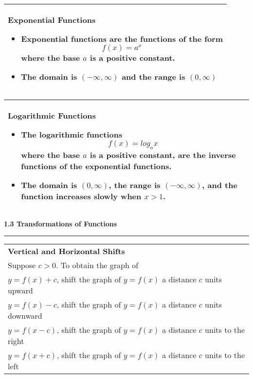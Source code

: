 \documentclass[fleqn]{article}
\begin{document}
\begin{center}
\def\arraystretch{1.3}
{\setlength{\tabcolsep}{16pt}
\begin{tabularx}{.9\textwidth}{|X|}
\hline
	\vspace{1pt}
	\textbf{Exponential Functions}
	\begin{itemize}
	\item \textbf{Exponential functions} are the functions of the form 
	$$f(x) = a^x$$
	where the base $a$ is a positive constant.
	\item The domain is $(-\infty, \infty)$ and the range is $(0,\infty)$
	\end{itemize} \\
\hline
\end{tabularx}}
\vspace{12pt}

\def\arraystretch{1.3}
{\setlength{\tabcolsep}{16pt}
\begin{tabularx}{.9\textwidth}{|X|}
\hline
	\vspace{1pt}
	\textbf{Logarithmic Functions}
	\begin{itemize}
	\item The \textbf{logarithmic functions}
	$$f(x) = log_a x$$
	where the base $a$ is a positive constant, are the inverse functions of the exponential functions. 
	\item The domain is $(0, \infty)$, the range is $(-\infty, \infty)$, and the function increases slowly when $x > 1$.
	\end{itemize} \\
\hline
\end{tabularx}}
\vspace{64pt}

\Large\textbf{1.3 Transformations of Functions}

\noindent\hfill\rule{0.3\textwidth}{.4pt}\hfill
\vspace{12pt}

\large

\def\arraystretch{1.3}
{\setlength{\tabcolsep}{16pt}
\begin{tabularx}{.9\textwidth}{|X|}
\hline
	\vspace{1pt}
	\textbf{Vertical and Horizontal Shifts} \\[6pt]
	\hspace{12pt} Suppose $c>0$. To obtain the graph of \\[6pt]
	\hspace{12pt} $y = f(x) + c$, shift the graph of $y = f(x)$ a distance $c$ units upward \\[3pt]
	\hspace{12pt} $y = f(x) - c$, shift the graph of $y = f(x)$ a distance $c$ units downward \\[3pt]
	\hspace{12pt} $y = f(x-c)$, shift the graph of $y = f(x)$ a distance $c$ units to the right \\[3pt]
	\hspace{12pt} $y = f(x+c)$, shift the graph of $y = f(x)$ a distance $c$ units to the left \\[12pt]	
\hline
\end{tabularx}}
\vspace{12pt}


\end{center}
\end{document}
